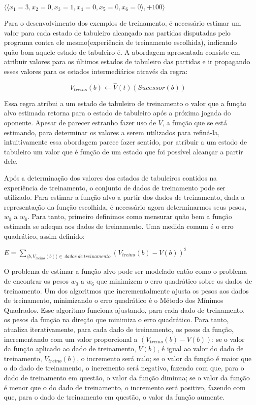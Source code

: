 $\langle \langle x_1 = 3, x_2 = 0, x_3 = 1, x_4 = 0, x_5 = 0, x_6 = 0 \rangle, +100\rangle$

Para o desenvolvimento dos exemplos de treinamento, é necessário estimar um valor para cada estado de tabuleiro alcançado nas partidas disputadas pelo programa contra ele mesmo(experiência de treinamento escolhida), indicando quão bom aquele estado de tabuleiro é. A abordagem apresentada consiste em atribuir valores para os últimos estados de tabuleiro das partidas e ir propagando esses valores para os estados intermediários através da regra:

\begin{equation}
V_{treino}(b) \leftarrow \overset{-}{V}(t)(Sucessor(b))
\label{eq:critico}
\end{equation}




Essa regra atribui a um estado de tabuleiro de treinamento o valor que a função alvo estimada retorna para o estado de tabuleiro após a próxima jogada do oponente. Apesar de parecer estranho fazer uso de $V$, a função que se está estimando, para determinar os valores a serem utilizados para refiná-la, intuitivamente essa abordagem parece fazer sentido, por atribuir a um estado de tabuleiro um valor que é função de um estado que foi possível alcançar a partir dele. 

Após a determinação dos valores dos estados de tabuleiros contidos na experiência de treinamento, o conjunto de dados de treinamento pode ser utilizado. Para estimar a função alvo a partir dos dados de treinamento, dada a representação da função escolhida, é necessário agora determinarmos seus pesos, $w_0$ a $w_6$. Para tanto, primeiro definimos como mensurar quão bem a função estimada se adequa aos dados de treinamento. Uma medida comum é o erro quadrático, assim definido:

$E = \sum\limits_{\langle b, V_{treino}(b) \rangle \in \ dados\ de\ treinamento} {(V_{treino}(b) - V(b))}^2$

O problema de estimar a função alvo pode ser modelado então como o problema de encontrar os pesos $w_0$ a $w_6$ que minimizem o erro quadrático sobre os dados de treinamento. Um dos algoritmos que incrementalmente ajusta os pesos aos dados de treinamento, minimizando o erro quadrático é o Método dos Mínimos Quadrados. Esse algoritmo funciona ajustando, para cada dado de treinamento, os pesos da função na direção que minimiza o erro quadrático. Para tanto, atualiza iterativamente, para cada dado de treinamento, os pesos da função, incrementando com um valor proporcional a $(V_{treino}(b) - V(b))$: se o valor da função aplicado ao dado de treinamento, $V(b)$, é igual ao valor do dado de treinamento, $V_{treino}(b)$, o incremento será nulo; se o valor da função é maior que o do dado de treinamento, o incremento será negativo, fazendo com que, para o dado de treinamento em questão, o valor da função diminua; se o valor da função é menor que o do dado de treinamento, o incremento será positivo, fazendo com que, para o dado de treinamento em questão, o valor da função aumente.

